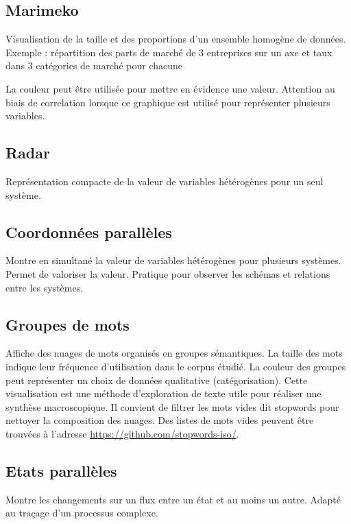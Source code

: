 \documentclass[a4paper,12pt]{article}
\begin{document}
\begin{multicols}{2}
\subsection*{Marimeko}
\label{sec:org9073fcc}
Visualisation de la taille et des proportions d'un ensemble homogène de données. \autocite{alansmithLexiqueVisuel}
Exemple : répartition des parts de marché de 3 entreprises sur un axe et taux dans 3 catégories de marché pour chacune

La couleur peut être utilisée pour mettre en évidence une valeur. \autocite{jonathanschwabishComparingCategories2021} Attention au biais de correlation lorsque ce graphique est utilisé pour représenter plusieurs variables. \autocite{jonathanschwabishComparingCategories2021}
\subsection*{Radar}
\label{sec:org550dd61}
Représentation compacte de la valeur de variables hétérogènes pour un seul système. \autocite{alansmithLexiqueVisuel}
\subsection*{Coordonnées parallèles}
\label{sec:orgea46aee}
Montre en simultané la valeur de variables hétérogènes pour plusieurs systèmes. Permet de valoriser la valeur. \autocite{alansmithLexiqueVisuel}
Pratique pour observer les schémas et relations entre les systèmes. \autocite{mikeyiHowChooseRight2020}
\subsection*{Groupes de mots}
\label{sec:orgb653435}
Affiche des nuages de mots organisés en groupes sémantiques. La taille des mots indique leur fréquence d'utilisation dans le corpus étudié. La couleur des groupes peut représenter un choix de données qualitative (catégorisation). \autocite{sosulskiGraphics2019} Cette visualisation est une méthode d'exploration de texte utile pour réaliser une synthèse macroscopique.
Il convient de filtrer les mots vides dit \og stopwords\fg{} pour nettoyer la composition des nuages. \autocite{jonathanschwabishQualitative2021} Des listes de mots vides peuvent être trouvées à l'adresse \url{https://github.com/stopwords-iso/}.
\subsection*{Etats parallèles}
\label{sec:orgfc1f06d}
Montre les changements sur un flux entre un état et au moins un autre. Adapté au traçage d'un processus complexe. \autocite{alansmithLexiqueVisuel}

\end{multicols}
\end{document}
